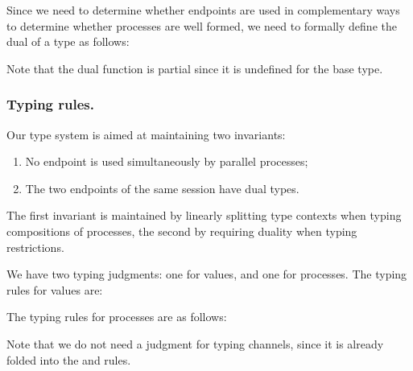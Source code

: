 Since we need to determine whether endpoints are used in complementary ways to determine whether processes are well formed, we need to formally define the dual of a type as follows:
Note that the dual function is partial since it is undefined for the base type.

\subsubsection{Typing rules.}
Our type system is aimed at maintaining two invariants:
\begin{enumerate}
\item No endpoint is used simultaneously by parallel processes;
\item The two endpoints of the same session have dual types.
\end{enumerate}
The first invariant is maintained by linearly splitting type contexts when typing compositions of processes, the second by requiring duality when typing restrictions.

We have two typing judgments: one for values, and one for processes.
The typing rules for values are:
The typing rules for processes are as follows:
Note that we do not need a judgment for typing channels, since it is already folded into the  and  rules.

